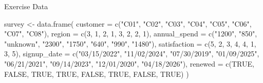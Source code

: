 \documentclass[
  ignorenonframetext,
  aspectratio=169,
]{beamer}
\newenvironment{Shaded}{\begin{snugshade}}{\end{snugshade}}
\newcommand{\AttributeTok}[1]{\textcolor[rgb]{0.40,0.45,0.13}{#1}}
\newcommand{\ConstantTok}[1]{\textcolor[rgb]{0.56,0.35,0.01}{#1}}
\newcommand{\DecValTok}[1]{\textcolor[rgb]{0.68,0.00,0.00}{#1}}
\newcommand{\FunctionTok}[1]{\textcolor[rgb]{0.28,0.35,0.67}{#1}}
\newcommand{\NormalTok}[1]{\textcolor[rgb]{0.00,0.23,0.31}{#1}}
\newcommand{\OtherTok}[1]{\textcolor[rgb]{0.00,0.23,0.31}{#1}}
\newcommand{\StringTok}[1]{\textcolor[rgb]{0.13,0.47,0.30}{#1}}
\begin{document}
\begin{frame}[fragile]{Exercise Data}
\protect\hypertarget{exercise-data}{}
\begin{Shaded}
\begin{Highlighting}[]
\NormalTok{survey }\OtherTok{\textless{}{-}} \FunctionTok{data.frame}\NormalTok{(}
  \AttributeTok{customer     =} \FunctionTok{c}\NormalTok{(}\StringTok{"C01"}\NormalTok{, }\StringTok{"C02"}\NormalTok{, }\StringTok{"C03"}\NormalTok{, }\StringTok{"C04"}\NormalTok{, }\StringTok{"C05"}\NormalTok{, }\StringTok{"C06"}\NormalTok{, }\StringTok{"C07"}\NormalTok{, }\StringTok{"C08"}\NormalTok{),}
  \AttributeTok{region       =} \FunctionTok{c}\NormalTok{(}\DecValTok{3}\NormalTok{, }\DecValTok{1}\NormalTok{, }\DecValTok{2}\NormalTok{, }\DecValTok{1}\NormalTok{, }\DecValTok{3}\NormalTok{, }\DecValTok{2}\NormalTok{, }\DecValTok{2}\NormalTok{, }\DecValTok{1}\NormalTok{),}
  \AttributeTok{annual\_spend =} \FunctionTok{c}\NormalTok{(}\StringTok{"1200"}\NormalTok{, }\StringTok{"850"}\NormalTok{, }\StringTok{"unknown"}\NormalTok{, }\StringTok{"2300"}\NormalTok{, }\StringTok{"1750"}\NormalTok{, }\StringTok{"640"}\NormalTok{, }\StringTok{"990"}\NormalTok{, }\StringTok{"1480"}\NormalTok{),}
  \AttributeTok{satisfaction =} \FunctionTok{c}\NormalTok{(}\DecValTok{5}\NormalTok{, }\DecValTok{2}\NormalTok{, }\DecValTok{3}\NormalTok{, }\DecValTok{4}\NormalTok{, }\DecValTok{4}\NormalTok{, }\DecValTok{1}\NormalTok{, }\DecValTok{3}\NormalTok{, }\DecValTok{5}\NormalTok{),}
  \AttributeTok{signup\_date  =} \FunctionTok{c}\NormalTok{(}\StringTok{"03/15/2022"}\NormalTok{, }\StringTok{"11/02/2024"}\NormalTok{, }\StringTok{"07/30/2019"}\NormalTok{, }\StringTok{"01/09/2025"}\NormalTok{,}
                   \StringTok{"06/21/2021"}\NormalTok{, }\StringTok{"09/14/2023"}\NormalTok{, }\StringTok{"12/01/2020"}\NormalTok{, }\StringTok{"04/18/2026"}\NormalTok{),}
  \AttributeTok{renewed      =} \FunctionTok{c}\NormalTok{(}\ConstantTok{TRUE}\NormalTok{, }\ConstantTok{FALSE}\NormalTok{, }\ConstantTok{TRUE}\NormalTok{, }\ConstantTok{TRUE}\NormalTok{, }\ConstantTok{FALSE}\NormalTok{, }\ConstantTok{TRUE}\NormalTok{, }\ConstantTok{FALSE}\NormalTok{, }\ConstantTok{TRUE}\NormalTok{)}
\NormalTok{)}
\end{Highlighting}
\end{Shaded}
\end{frame}
\end{document}
